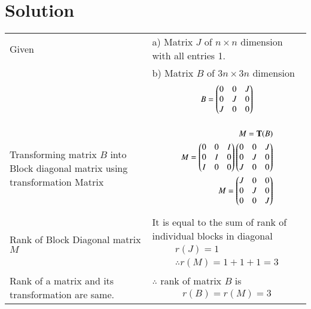 \documentclass[journal,12pt,twocolumn]{IEEEtran}
\begin{document}
\section{Solution}
\begin{table}[h!]
\begin{center}
\begin{tabular}{ | m{3cm} | m{5cm}| } \hline 
Given  &  a) Matrix $J$ of $n \times n$ dimension with all entries 1.\\&  
b) Matrix $B$ of $3n \times 3n$ dimension { 
\begin{align*}
B = \begin{pmatrix}0&0&J\\0&J&0\\J&0&0\end{pmatrix}
\end{align*}}\\  \hline
Transforming matrix $B$ into Block diagonal matrix using transformation Matrix & {\begin{align*}
M = \mathbf{T}(B)\\
M = \begin{pmatrix}0&0&I\\0&I&0\\I&0&0\end{pmatrix} \begin{pmatrix}0&0&J\\0&J&0\\J&0&0\end{pmatrix}\\
M = \begin{pmatrix}J&0&0\\0&J&0\\0&0&J\end{pmatrix}
\end{align*}}\\  \hline
Rank of Block Diagonal matrix $M$ & It is equal to the sum of rank of individual blocks in diagonal{\begin{align*}
r(J) = 1\\
\therefore r(M) = 1 + 1 + 1 = 3
\end{align*}}\\ \hline
Rank of a matrix and its transformation are same. & $\therefore$ rank of matrix $B$ is {\begin{align*}r(B) = r(M) =3
\end{align*}}\\ \hline 
\end{tabular}
\end{center}
\end{table}
\end{document}
